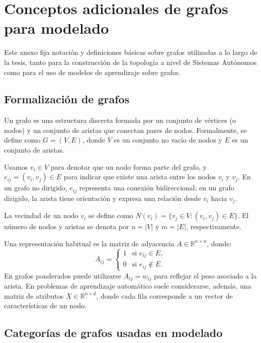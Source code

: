 \section{Conceptos adicionales de grafos para modelado} \label{sec:anexo_conceptos_grafos_modelado}

Este anexo fija notación y definiciones básicas sobre grafos utilizadas a lo largo de la tesis, tanto para la construcción de la topología a nivel de Sistemas Autónomos como para el uso de modelos de aprendizaje sobre grafos.

\subsection{Formalización de grafos}

Un grafo es una estructura discreta formada por un conjunto de vértices (o nodos) y un conjunto de aristas que conectan pares de nodos. Formalmente, se define como $G=(V,E)$, donde $V$ es un conjunto no vacío de nodos y $E$ es un conjunto de aristas.

Usamos $v_i \in V$ para denotar que un nodo forma parte del grafo, y $e_{ij}=(v_i,v_j)\in E$ para indicar que existe una arista entre los nodos $v_i$ y $v_j$. En un grafo no dirigido, $e_{ij}$ representa una conexión bidireccional; en un grafo dirigido, la arista tiene orientación y expresa una relación desde $v_i$ hacia $v_j$.

La vecindad de un nodo $v_i$ se define como $N(v_i)=\{v_j \in V : (v_i,v_j)\in E\}$. El número de nodos y aristas se denota por $n=|V|$ y $m=|E|$, respectivamente.

Una representación habitual es la matriz de adyacencia $A\in\mathbb{R}^{n\times n}$, donde:
\[
A_{ij} =
\begin{cases}
1 & \text{si } e_{ij}\in E,\\
0 & \text{si } e_{ij}\notin E.
\end{cases}
\]
En grafos ponderados puede utilizarse $A_{ij}=w_{ij}$ para reflejar el peso asociado a la arista. En problemas de aprendizaje automático suele considerarse, además, una matriz de atributos $X\in\mathbb{R}^{n\times d}$, donde cada fila corresponde a un vector de características de un nodo.

\subsection{Categorías de grafos usadas en modelado}

